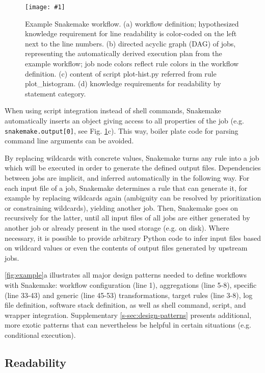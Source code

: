 \documentclass[parskip=half]{scrartcl}
\newcommand{\image}[1]{\centering\texttt{[image: \#1]}}
\begin{document}
\begin{figure}
	\image{example-workflow.pdf}
	\caption{
		Example Snakemake workflow. (a) workflow definition; hypothesized knowledge requirement for line readability is color-coded on the left next to the line numbers. (b) directed acyclic graph (DAG) of jobs, representing the automatically derived execution plan from the example workflow; job node colors reflect rule colors in the workflow definition. (c) content of script plot-hist.py referred from rule plot\_histogram. (d) knowledge requirements for readability by statement category.
	}
	\label{fig:example}
\end{figure}

When using script integration instead of shell commands, Snakemake automatically inserts an object giving access to all properties of the job (e.g. \lstinline!snakemake.output[0]!, see Fig.
\ref{fig:example}c).
This way, boiler plate code for parsing command line arguments can be avoided.

By replacing wildcards with concrete values, Snakemake turns any rule into a job which will be executed in order to generate the defined output files.
Dependencies between jobs are implicit, and inferred automatically in the following way.
For each input file of a job, Snakemake determines a rule that can generate it, for example by replacing wildcards again (ambiguity can be resolved by prioritization or constraining wildcards), yielding another job.
Then, Snakemake goes on recursively for the latter, until all input files of all jobs are either generated by another job or already present in the used storage (e.g. on disk).
Where necessary, it is possible to provide arbitrary Python code to infer input files based on wildcard values or even the contents of output files generated by upstream jobs.

\autoref{fig:example}a illustrates all major design patterns needed to define workflows with Snakemake: workflow configuration (line 1), aggregations (line 5-8), specific (line 33-43) and generic (line 45-53) transformations, target rules (line 3-8), log file definition, software stack definition, as well as shell command, script, and wrapper integration.
Supplementary \autoref{s-sec:design-patterns} presents additional, more exotic patterns that can nevertheless be helpful in certain situations (e.g. conditional execution).

\subsection{Readability}
\end{document}
